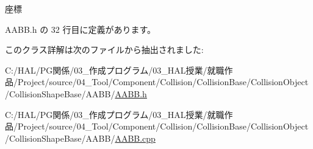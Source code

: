 座標 



 A\+A\+B\+B.\+h の 32 行目に定義があります。



このクラス詳解は次のファイルから抽出されました\+:\begin{DoxyCompactItemize}
\item 
C\+:/\+H\+A\+L/\+P\+G関係/03\+\_\+作成プログラム/03\+\_\+\+H\+A\+L授業/就職作品/\+Project/source/04\+\_\+\+Tool/\+Component/\+Collision/\+Collision\+Base/\+Collision\+Object/\+Collision\+Shape\+Base/\+A\+A\+B\+B/\mbox{\hyperlink{_a_a_b_b_8h}{A\+A\+B\+B.\+h}}\item 
C\+:/\+H\+A\+L/\+P\+G関係/03\+\_\+作成プログラム/03\+\_\+\+H\+A\+L授業/就職作品/\+Project/source/04\+\_\+\+Tool/\+Component/\+Collision/\+Collision\+Base/\+Collision\+Object/\+Collision\+Shape\+Base/\+A\+A\+B\+B/\mbox{\hyperlink{_a_a_b_b_8cpp}{A\+A\+B\+B.\+cpp}}\end{DoxyCompactItemize}
